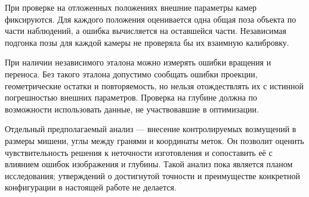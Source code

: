При проверке на отложенных положениях внешние параметры камер фиксируются. Для каждого положения оценивается одна общая поза объекта по части наблюдений, а ошибка вычисляется на оставшейся части. Независимая подгонка позы для каждой камеры не проверяла бы их взаимную калибровку.

При наличии независимого эталона можно измерять ошибки вращения и переноса. Без такого эталона допустимо сообщать ошибки проекции, геометрические остатки и повторяемость, но нельзя отождествлять их с истинной погрешностью внешних параметров. Проверка на глубине должна по возможности использовать данные, не участвовавшие в оптимизации.

Отдельный предполагаемый анализ --- внесение контролируемых возмущений в размеры мишени, углы между гранями и координаты меток. Он позволит оценить чувствительность решения к неточности изготовления и сопоставить её с влиянием ошибок изображения и глубины. Такой анализ пока является планом исследования; утверждений о достигнутой точности и преимуществе конкретной конфигурации в настоящей работе не делается.
